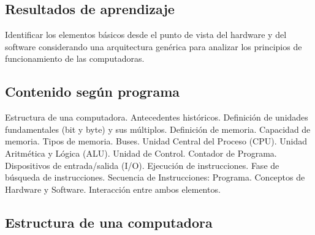 \subsection*{Resultados de aprendizaje}
Identificar los elementos básicos desde el punto de vista del hardware y del software considerando una arquitectura genérica para analizar los principios de funcionamiento de las computadoras.

\subsection*{Contenido según programa}
Estructura de una computadora.  Antecedentes históricos.  Definición de unidades fundamentales (bit y byte) y sus múltiplos. Definición de memoria. Capacidad de memoria. Tipos de memoria. Buses. Unidad Central del Proceso (CPU).  Unidad Aritmética y Lógica (ALU). Unidad de Control.  Contador de Programa.  Dispositivos de entrada/salida (I/O).  Ejecución de instrucciones.  Fase de búsqueda de instrucciones. Secuencia de Instrucciones: Programa.  Conceptos de Hardware y Software. Interacción entre ambos elementos.


\subsection*{Estructura de una computadora}

